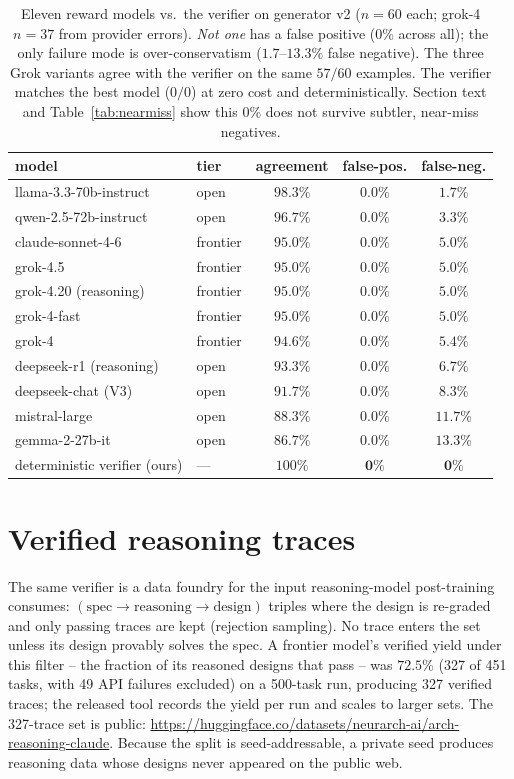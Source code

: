 \documentclass[11pt]{article}
\begin{document}
\begin{table}[t]
\centering
\small
\begin{tabular}{llccc}
\toprule
model & tier & agreement & false-pos. & false-neg. \\
\midrule
llama-3.3-70b-instruct & open & $98.3\%$ & $\mathbf{0.0\%}$ & $1.7\%$ \\
qwen-2.5-72b-instruct & open & $96.7\%$ & $\mathbf{0.0\%}$ & $3.3\%$ \\
claude-sonnet-4-6 & frontier & $95.0\%$ & $\mathbf{0.0\%}$ & $5.0\%$ \\
grok-4.5 & frontier & $95.0\%$ & $\mathbf{0.0\%}$ & $5.0\%$ \\
grok-4.20 (reasoning) & frontier & $95.0\%$ & $\mathbf{0.0\%}$ & $5.0\%$ \\
grok-4-fast & frontier & $95.0\%$ & $\mathbf{0.0\%}$ & $5.0\%$ \\
grok-4 & frontier & $94.6\%$ & $\mathbf{0.0\%}$ & $5.4\%$ \\
deepseek-r1 (reasoning) & open & $93.3\%$ & $\mathbf{0.0\%}$ & $6.7\%$ \\
deepseek-chat (V3) & open & $91.7\%$ & $\mathbf{0.0\%}$ & $8.3\%$ \\
mistral-large & open & $88.3\%$ & $\mathbf{0.0\%}$ & $11.7\%$ \\
gemma-2-27b-it & open & $86.7\%$ & $\mathbf{0.0\%}$ & $13.3\%$ \\
\midrule
deterministic verifier (ours) & --- & $100\%$ & $\mathbf{0\%}$ & $\mathbf{0\%}$ \\
\bottomrule
\end{tabular}
\caption{Eleven reward models vs.\ the verifier on generator v2 ($n{=}60$ each; grok-4 $n{=}37$ from provider errors). \emph{Not one} has a false positive ($0\%$ across all); the only failure mode is over-conservatism ($1.7$--$13.3\%$ false negative). The three Grok variants agree with the verifier on the same $57/60$ examples. The verifier matches the best model ($0/0$) at zero cost and deterministically. Section text and Table~\ref{tab:nearmiss} show this $0\%$ does not survive subtler, near-miss negatives.}
\label{tab:rewardmodel}
\end{table}

\section{Verified reasoning traces}
The same verifier is a data foundry for the input reasoning-model post-training consumes: $(\text{spec}\to\text{reasoning}\to\text{design})$ triples where the design is re-graded and only passing traces are kept (rejection sampling). No trace enters the set unless its design provably solves the spec. A frontier model's verified yield under this filter -- the fraction of its reasoned designs that pass -- was $72.5\%$ (327 of 451 tasks, with 49 API failures excluded) on a 500-task run, producing 327 verified traces; the released tool records the yield per run and scales to larger sets. The 327-trace set is public: \url{https://huggingface.co/datasets/neurarch-ai/arch-reasoning-claude}. Because the split is seed-addressable, a private seed produces reasoning data whose designs never appeared on the public web.
\end{document}
